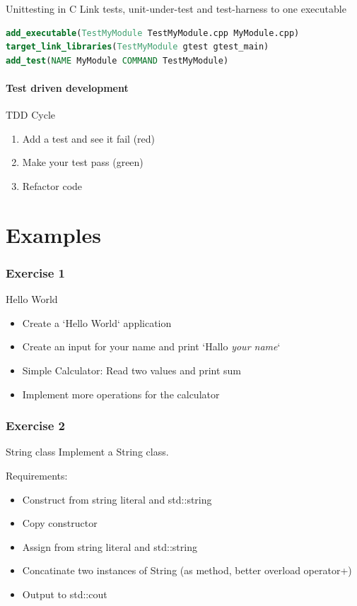 \documentclass{beamer}
\begin{document}
\begin{frame}[fragile]{Unittesting in C}
Link tests, unit-under-test and test-harness to one executable
\begin{lstlisting}[language=cmake,caption=a unit test in cmake]
add_executable(TestMyModule TestMyModule.cpp MyModule.cpp)
target_link_libraries(TestMyModule gtest gtest_main)
add_test(NAME MyModule COMMAND TestMyModule)
\end{lstlisting}
\end{frame}

\subsection{Test driven development}

\begin{frame}{TDD Cycle}
\begin{enumerate}
  \item Add a test and see it fail (red)
  \item Make your test pass (green)
  \item Refactor code
\end{enumerate}
\end{frame}


\part{Examples}

\section{Exercise 1}
\begin{frame}{Hello World}
\begin{itemize}
  \item Create a `Hello World` application
  \item Create an input for your name and print `Hallo \textit{your name}`
  \item Simple Calculator: Read two values and print sum
  \item Implement more operations for the calculator
\end{itemize}
\end{frame}

\section{Exercise 2}

\begin{frame}{String class}
Implement a String class.

Requirements:
\begin{itemize}
  \item Construct from string literal and std::string
  \item Copy constructor
  \item Assign from string literal and std::string
  \item Concatinate two instances of String (as method, better overload
  operator+)
  \item Output to std::cout
\end{itemize}
\end{frame}
\end{document}
